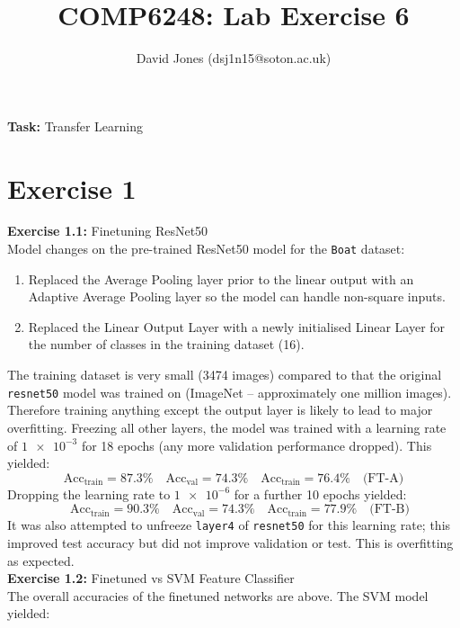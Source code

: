 \documentclass[11pt,a4paper]{article}
\title{COMP6248: Lab Exercise 6}
\author{
David Jones (dsj1n15@soton.ac.uk)}
\date{}
\begin{document}
\maketitle
\textbf{Task:} Transfer Learning
\vspace{-0.5em}
\section{Exercise 1}
\textbf{Exercise 1.1:} Finetuning ResNet50\vspace{0.5em}\\
Model changes on the pre-trained ResNet50 model for the \texttt{Boat} dataset:
\begin{enumerate}
    \item Replaced the Average Pooling layer prior to the linear output with an Adaptive Average Pooling layer so the model can handle non-square inputs.
    \item Replaced the Linear Output Layer with a newly initialised Linear Layer for the number of classes in the training dataset (16).
\end{enumerate}

\noindent The training dataset is very small (3474 images) compared to that the original \texttt{resnet50} model was trained on (ImageNet -- approximately one million images). Therefore training anything except the output layer is likely to lead to major overfitting. Freezing all other layers, the model was trained with a learning rate of $\num{1e-3}$ for 18 epochs (any more validation performance dropped). This yielded:
\begin{equation*}
    \text{Acc}_\text{train} = 87.3\% \quad \text{Acc}_\text{val} = 74.3\% \quad \text{Acc}_\text{train} = 76.4\% \quad \text{(FT-A)}
\end{equation*}
Dropping the learning rate to $\num{1e-6}$ for a further 10 epochs yielded:
\begin{equation*}
    \quad\text{Acc}_\text{train} = 90.3\% \quad \text{Acc}_\text{val} = 74.3\% \quad \text{Acc}_\text{train} = 77.9\% \quad \text{(FT-B)}
\end{equation*}
It was also attempted to unfreeze \texttt{layer4} of \texttt{resnet50} for this learning rate; this improved test accuracy but did not improve validation or test. This is overfitting as expected.\\

\noindent\textbf{Exercise 1.2:} Finetuned vs SVM Feature Classifier\vspace{0.5em}\\
The overall accuracies of the finetuned networks are above. The SVM model yielded:
\end{document}
